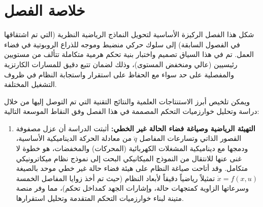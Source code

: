 \section{خلاصة الفصل }
شكل هذا الفصل الركيزة الأساسية لتحويل النماذج الرياضية النظرية (التي تم اشتقاقها في الفصول السابقة) إلى سلوك حركي منضبط وموجه للذراع الروبوتية في فضاء العمل. تم في هذا السياق تصميم واختبار بنية تحكم هرمية متكاملة تتألف من مستويين رئيسيين (عالي ومنخفض المستوى)، وذلك لضمان تتبع دقيق للمسارات الكارتزية والمفصلية على حد سواء مع الحفاظ على استقرار واستجابة النظام في ظروف التشغيل المختلفة. 

ويمكن تلخيص أبرز الاستنتاجات العلمية والنتائج التقنية التي تم التوصل إليها من خلال دراسة وتحليل خوارزميات التحكم المصممة في هذا الفصل وفق النقاط الموسعة التالية:

\begin{enumerate}
    \item \textbf{التهيئة الرياضية وصياغة فضاء الحالة غير الخطي:}
    أثبتت الدراسة أن عزل مصفوفة القصور الذاتي وتسارعات المفاصل $\ddot{q}$ من معادلة الحركة الديناميكية الأساسية، ودمجها مع ديناميكية المشغلات الكهربائية (المحركات) والمخفضات، هو خطوة لا غنى عنها للانتقال من النموذج الميكانيكي البحت إلى نموذج نظام ميكاترونيكي متكامل. وقد أتاحت صياغة النظام على هيئة فضاء حالة غير خطي موحد بالصيغة $\dot{x}=f(x,u)$ تمثيلاً رياضياً دقيقاً لأبعاد النظام (حيث تم أخذ زوايا المفاصل الخمسة وسرعاتها الزاوية كمتجهات حالة، وإشارات الجهد كمداخل تحكم)، مما وفر منصة متينة لبناء خوارزميات التحكم المتقدمة وتحليل استقرارها.


\end{enumerate}
